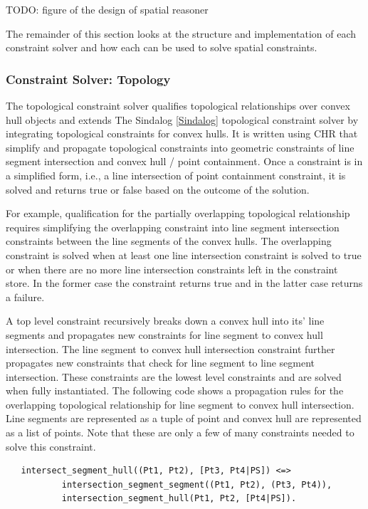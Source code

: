 \documentclass[12pt]{ucthesis}
\begin{document}
TODO: figure of the design of spatial reasoner

The remainder of this section looks at the structure and implementation of each constraint solver and how each can be used to solve spatial constraints.

\subsubsection{Constraint Solver: Topology}
The topological constraint solver qualifies topological relationships over convex hull objects and extends The Sindalog \ref{Sindalog} topological constraint solver by integrating topological constraints for convex hulls. It is written using CHR that simplify and propagate topological constraints into geometric constraints of line segment intersection and convex hull / point containment. Once a constraint is in a simplified form, i.e., a line intersection of point containment constraint, it is solved and returns true or false based on the outcome of the solution.   

For example, qualification for the partially overlapping topological relationship requires simplifying the overlapping constraint into line segment intersection constraints between the line segments of the convex hulls. The overlapping constraint is solved when at least one line intersection constraint is solved to true or when there are no more line intersection constraints left in the constraint store. In the former case the constraint returns true and in the latter case returns a failure. 

A top level constraint recursively breaks down a convex hull into its' line segments and propagates new constraints for line segment to convex hull intersection. The line segment to convex hull intersection constraint further propagates new constraints that check for line segment to line segment intersection. These constraints are the lowest level constraints and are solved when fully instantiated. The following code shows a propagation rules for the overlapping topological relationship for line segment to convex hull intersection. Line segments are represented as a tuple of point and convex hull are represented as a list of points. Note that these are only a few of many constraints needed to solve this constraint.  

\begin{verbatim}
   intersect_segment_hull((Pt1, Pt2), [Pt3, Pt4|PS]) <=>
           intersection_segment_segment((Pt1, Pt2), (Pt3, Pt4)),
           intersection_segment_hull(Pt1, Pt2, [Pt4|PS]).
\end{verbatim}
\end{document}
